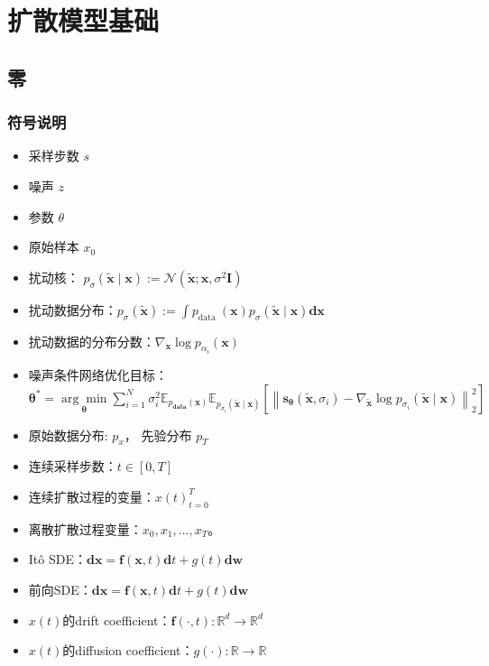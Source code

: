 \part{扩散模型基础}
\chapter{零}
\section{符号说明}
\begin{itemize}
    \item 采样步数 $s$
    \item 噪声 $z$
    \item 参数 $\theta$
    \item 原始样本 $x_0$
    \item  扰动核： $p_\sigma(\tilde{\mathbf{x}} \mid \mathbf{x}):=\mathcal{N}\left(\tilde{\mathbf{x}} ;\mathbf{x}, \sigma^2 \mathbf{I}\right)$
    \item 扰动数据分布：$p_\sigma(\tilde{\mathbf{x}}):=\int p_{\text {data }}(\mathbf{x})p_\sigma(\tilde{\mathbf{x}} \mid \mathbf{x}) \mathbf{d} \mathbf{x}$
    \item 扰动数据的分布分数：$\nabla_{\mathbf{x}} \log p_{\alpha_i}(\mathbf{x})$
    \item 噪声条件网络优化目标：$\boldsymbol{\theta}^*=\underset{\boldsymbol{\theta}}{\arg \min } \sum_{i=1}^N \sigma_i^2 \mathbb{E}_{p_{\mathbf{data}}(\mathbf{x})} \mathbb{E}_{p_{\sigma_i}(\tilde{\mathbf{x}} \mid \mathbf{x})}\left[\left\|\mathbf{s}_{\boldsymbol{\theta}}\left(\tilde{\mathbf{x}}, \sigma_i\right)-\nabla_{\tilde{\mathbf{x}}} \log p_{\sigma_i}(\tilde{\mathbf{x}} \mid \mathbf{x})\right\|_2^2\right]$
    \item  原始数据分布: $p_x$， 先验分布 $p_T$
    \item 连续采样步数：$t \in [0, T]$
    \item 连续扩散过程的变量：${x(t)}_{t=0}^{T}$
    \item 离散扩散过程变量：$x_0,x_1,\ldots,x_T$。
    \item Itô SDE：$\mathbf{d} \mathbf{x}=\mathbf{f}(\mathbf{x}, t) \mathbf{d} t+g(t) \mathbf{d} \mathbf{w}$
    \item  前向SDE：$\mathbf{d} \mathbf{x}=\mathbf{f}(\mathbf{x}, t) \mathbf{d} t+g(t) \mathbf{d} \mathbf{w}$
    \item $x(t)$的drift coefficient：$\mathbf{f}(\cdot, t): \mathbb{R}^d \rightarrow \mathbb{R}^d$
    \item $x(t)$的diffusion coefficient：$g(\cdot):\mathbb{R} \rightarrow \mathbb{R}$

\end{itemize}
